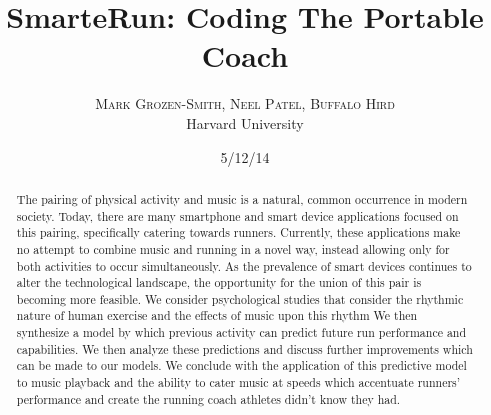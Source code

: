 \documentclass[twoside]{article}
\title{\vspace{-15mm}\fontsize{24pt}{10pt}\selectfont\textbf{SmarteRun: Coding The Portable Coach}} %
\author{
\large
\textsc{Mark Grozen-Smith, Neel Patel, Buffalo Hird}\\[2mm] %
\normalsize Harvard University \\ %
\vspace{-5mm}
}
\date{5/12/14}
\begin{document}
\maketitle %

\thispagestyle{fancy} %


\begin{abstract}

\noindent The pairing of physical activity and music is a natural, common occurrence in modern society.  Today, there are many smartphone and smart device applications focused on this pairing, specifically catering towards runners. Currently, these applications make no attempt to combine music and running in a novel way, instead allowing only for both activities to occur simultaneously. As the prevalence of smart devices continues to alter the technological landscape, the opportunity for the union of this pair is becoming more feasible.  We consider psychological studies that consider the rhythmic nature of human exercise and the effects of music upon this rhythm  We then synthesize a model by which previous activity can predict future run performance and capabilities. We then analyze these predictions and discuss further improvements which can be made to our models. We conclude with the application of this predictive model to music playback and the ability to cater music at speeds which accentuate runners' performance and create the running coach athletes didn't know they had.

\end{abstract}

\end{document}
